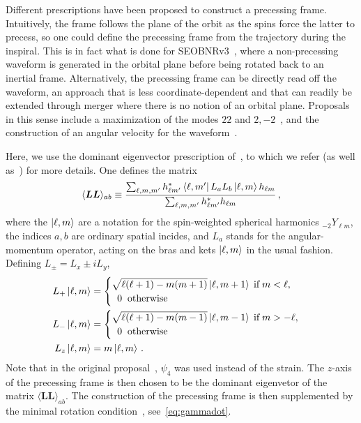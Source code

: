 \documentclass[aps,showpacs,twocolumn,
prd,superscriptaddress,nofootinbib]{revtex4-1}
\newcommand{\be}{\begin{equation}}
\newcommand{\ee}{\end{equation}}
\begin{document}
Different prescriptions have been proposed to construct a precessing frame. Intuitively, the frame follows the plane of the orbit as the spins force the latter to precess, so one could define the precessing frame from the trajectory during the inspiral. This is in fact what is done for SEOBNRv3~\cite{Pan+13}, where a non-precessing waveform is generated in the orbital plane before being rotated back to an inertial frame. Alternatively, the precessing frame can be directly read off the waveform, an approach that is less coordinate-dependent and that can readily be extended through merger where there is no notion of an orbital plane. Proposals in this sense include a maximization of the modes $22$ and $2,-2$~\cite{Schmidt+10}, and the construction of an angular velocity for the waveform~\cite{Boyle13}.

Here, we use the dominant eigenvector prescription of~\cite{OShaughnessy+11}, to which we refer (as well as~\cite{Boyle13}) for more details. One defines the matrix
\be
	\langle \bm{L} \bm{L} \rangle_{ab} \equiv \frac{\sum_{\ell, m, m'} h^{*}_{\ell m'} \bra{\ell, m'} L_{a} L_{b} \ket{\ell, m} h_{\ell m} }{ \sum_{\ell, m, m'} h^{*}_{\ell m'} h_{\ell m} } \,,
\ee
where the $\ket{\ell, m}$ are a notation for the spin-weighted spherical harmonics ${}_{-2}Y_{\ell m}$, the indices $a,b$ are ordinary spatial incides, and $L_{a}$ stands for the angular-momentum operator, acting on the bras and kets $\ket{\ell, m}$ in the usual fashion. Defining $L_{\pm} = L_{x} \pm i L_{y}$,
\begin{subequations}
\begin{align}
	L_{+} \ket{\ell, m} &= \begin{cases}\sqrt{\ell (\ell+1) - m (m+1)} \ket{\ell, m+1} \;\text{if} \; m<\ell, \\ \;\; 0 \;\;\text{otherwise} \end{cases} \\
	L_{-} \ket{\ell, m} &= \begin{cases}\sqrt{\ell (\ell+1) - m (m-1)} \ket{\ell, m-1} \; \text{if} \; m>-\ell, \\ \;\; 0 \;\;\text{otherwise} \end{cases} \\
	L_{z} \ket{\ell, m} &= m \ket{\ell, m} \,.
\end{align}
\end{subequations}
Note that in the original proposal~\cite{OShaughnessy+11}, $\psi_{4}$ was used instead of the strain. The $z$-axis of the precessing frame is then chosen to be the dominant eigenvetor of the matrix $\langle \bm{L} \bm{L} \rangle_{ab}$. The construction of the precessing frame is then supplemented by the minimal rotation condition~\cite{Boyle+11}, see~\eqref{eq:gammadot}.
\end{document}
